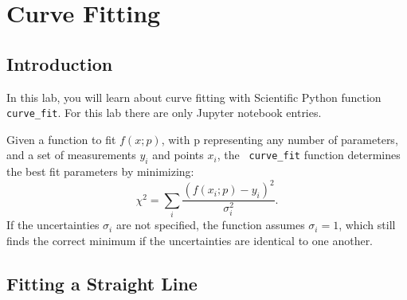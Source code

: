 \chapter{Curve Fitting}

\section{Introduction}

In this lab, you will learn about curve fitting with Scientific Python
function {\tt curve{\_}fit}.  For this lab there are only Jupyter notebook entries. 

Given a function to fit $f(x;p)$, with p representing any number of
parameters, and a set of measurements $y_i$ and points $x_i$, the {\tt
  curve{\_}fit} function determines the best fit parameters by
minimizing:
\begin{equation}
\chi^2 = \sum_i \frac{(f(x_i;p) - y_i) ^2}{\sigma_i^2}.
\label{eqn:chi2}
\end{equation}
If the uncertainties $\sigma_i$ are not specified, the function
assumes $\sigma_i = 1$, which still finds the correct minimum
if the uncertainties are identical to one another.

\section{Fitting a Straight Line}

